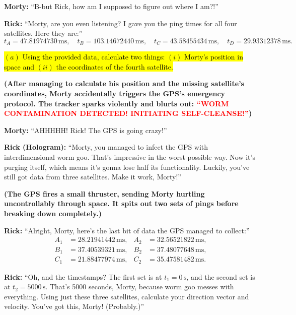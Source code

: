 \documentclass[a4paper, 12pt]{exam}
\begin{document}
\bigskip
\noindent \textbf{Morty:} “B-but Rick, how am I supposed to figure out where I am?!” \bigskip

\noindent \textbf{Rick:} “Morty, are you even listening? I gave you the ping times for all four satellites. Here they are:”
\[
t_A = 47.81974730 \, \text{ms}, \quad t_B = 103.14672440 \, \text{ms}, \quad t_C = 43.58455434 \, \text{ms}, \quad t_D = 29.93312378\, \text{ms}.
\]

\hl{$(a)$ Using the provided data, calculate two things: $(i)$ Morty's position in space and $(ii)$ the coordinates of the fourth satellite.}

\bigskip

\noindent \textbf{(After managing to calculate his position and the missing satellite’s coordinates, Morty accidentally triggers the GPS’s emergency protocol. The tracker sparks violently and blurts out: \textcolor{red}{“WORM CONTAMINATION DETECTED! INITIATING SELF-CLEANSE!”})}

\bigskip

\noindent \textbf{Morty:} “AHHHHH! Rick! The GPS is going crazy!” 

\bigskip

\noindent \textbf{Rick (Hologram):} “Morty, you managed to infect the GPS with interdimensional worm goo. That’s impressive in the worst possible way. Now it’s purging itself, which means it’s gonna lose half its functionality. Luckily, you’ve still got data from three satellites. Make it work, Morty!” 

\bigskip

\noindent \textbf{(The GPS fires a small thruster, sending Morty hurtling uncontrollably through space. It spits out two sets of pings before breaking down completely.)}

\bigskip

\noindent \textbf{Rick:} “Alright, Morty, here’s the last bit of data the GPS managed to collect:”
\[
\begin{aligned}
A_1 &= 28.21941442 \, \text{ms}, & A_2 &= 32.56521822 \, \text{ms}, \\
B_1 &= 37.40539321 \, \text{ms}, & B_2 &= 37.48077648 \, \text{ms}, \\
C_1 &= 21.88477974 \, \text{ms}, & C_2 &= 35.47581482 \, \text{ms}.
\end{aligned}
\]

\noindent \textbf{Rick:} “Oh, and the timestamps? The first set is at \(t_1 = 0 \, \text{s}\), and the second set is at \(t_2 = 5000 \, \text{s}\). That’s 5000 seconds, Morty, because worm goo messes with everything. Using just these three satellites, calculate your direction vector and velocity. You’ve got this, Morty! (Probably.)”
\end{document}
